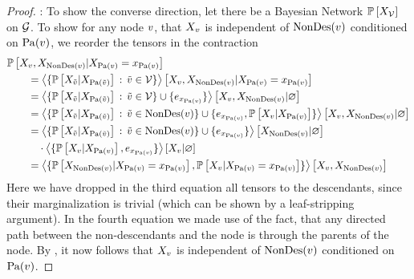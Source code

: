 \begin{proof}
	\proofleftsymbol:
	To show the converse direction, let there be a Bayesian Network $\mathbb{P}\left[X_{\mathcal{V}}\right]$ on $\mathcal{G}$.
	To show for any node $v$, that $X_{v}$ is independent of $\mathrm{NonDes}(v)$ conditioned on $\mathrm{Pa}(v)$, we reorder the tensors in the contraction
	\begin{align*}
		& \condprobof{\catvariableof{\node},\catvariableof{\nondescendantsof{\node}}}{\indexedcatvariableof{\parentsof{\node}}} \\
		& \quad\quad = \normationofwrt{
			\{\condprobof{\catvariableof{\secnode}}{\catvariableof{\parentsof{\secnode}}} \, : \, \secnode\in\nodes\}
		}
		{\catvariableof{\node},\catvariableof{\nondescendantsof{\node}}}
		{\indexedcatvariableof{\parentsof{\node}}} \\
		& \quad\quad  = \normationof{
			\{\condprobof{\catvariableof{\secnode}}{\catvariableof{\parentsof{\secnode}}} \, : \, \secnode\in\nodes\} \cup \{\onehotmapof{\catindexof{\parentsof{\node}}}\}
		}
		{\catvariableof{\node},\catvariableof{\nondescendantsof{\node}}}\\
		&  \quad\quad = \normationof{
			\{\condprobof{\catvariableof{\secnode}}{\catvariableof{\parentsof{\secnode}}} \, : \, \secnode\in\nondescendantsof{\node}\} \cup \{\onehotmapof{\catindexof{\parentsof{\node}}}, \condprobof{\catvariableof{\node}}{\catvariableof{\parentsof{\node}}} \}
		}
		{\catvariableof{\node},\catvariableof{\nondescendantsof{\node}}} \\
		&  \quad\quad =  %
		 \normationof{
			\{\condprobof{\catvariableof{\secnode}}{\catvariableof{\parentsof{\secnode}}} \, : \, \secnode\in\nondescendantsof{\node}\} \cup \{\onehotmapof{\catindexof{\parentsof{\node}}}\}
		}
		{\catvariableof{\nondescendantsof{\node}}} \\
		& \quad\quad  \quad  \cdot \normationof{
			\{\condprobof{\catvariableof{\node}}{\catvariableof{\parentsof{\node}}},\onehotmapof{\catindexof{\parentsof{\node}}}\}
		}
		{\catvariableof{\node}} \\
		& \quad\quad  = \contractionof{\{
		\condprobof{\catvariableof{\nondescendantsof{\node}}}{\indexedcatvariableof{\parentsof{\node}}},
		\condprobof{\catvariableof{\node}}{\indexedcatvariableof{\parentsof{\node}}}
		\}}{\catvariableof{\node},\catvariableof{\nondescendantsof{\node}}}
	\end{align*}
	Here we have dropped in the third equation all tensors to the descendants, since their marginalization is trivial (which can be shown by a leaf-stripping argument).
	In the fourth equation we made use of the fact, that any directed path between the non-descendants and the node is through the parents of the node.
	By , it now follows that $X_{v}$ is independent of $\mathrm{NonDes}(v)$ conditioned on $\mathrm{Pa}(v)$.
\end{proof}

